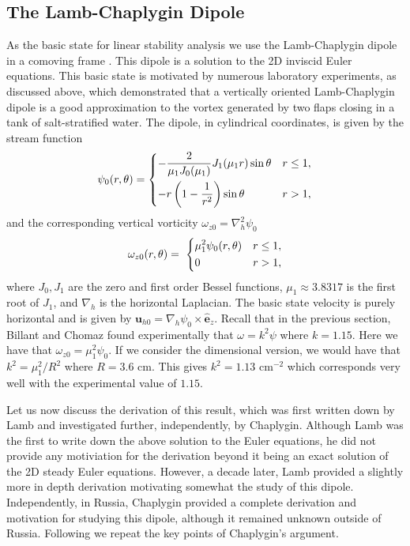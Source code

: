 \subsection{The Lamb-Chaplygin Dipole} 
As the basic state for linear stability analysis we use the Lamb-Chaplygin dipole in a comoving frame \cite{meleshko1994}. This dipole is a solution to the 2D inviscid Euler equations. This basic state is motivated by numerous laboratory experiments\cite{bc2000a,leweke1998}, as discussed above, which demonstrated that a vertically oriented Lamb-Chaplygin dipole is a good approximation to the vortex generated by two flaps closing in a tank of salt-stratified water. The dipole, in cylindrical coordinates, is given by the stream function
\begin{align}
\psi_{0}(r,\theta) = 
\begin{dcases}
-\frac{2}{\mu_{1}J_{0}(\mu_{1})}J_{1}(\mu_{1}r)\sin\theta & r\le 1,\\\label{lc_dipole_sf}
-r\left(1-\frac{1}{r^{2}}\right)\sin\theta & r>1 ,
\end{dcases}
\end{align}
and the corresponding vertical vorticity $\omega_{z0}=\nabla_{h}^{2}\psi_{0}$
\begin{align}
\omega_{z0}(r,\theta) = \
\begin{dcases}
\mu_{1}^{2}\psi_{0}(r,\theta) & r\le 1,\\
0 & r>1,
\end{dcases}
\end{align}
where $J_{0},J_{1}$ are the zero and first order Bessel functions, $\mu_{1}\approx 3.8317$ is the first root of $J_{1}$, and $\nabla_{h}$ is the horizontal Laplacian. The basic state velocity is purely horizontal and is given by $\bm{u}_{h0}=\nabla_{h}\psi_{0}\times\hat{\bm{e}}_{z}$. Recall that in the previous section, Billant and Chomaz found experimentally that $\omega = k^{2}\psi$ where $k=1.15$. Here we have that $\omega_{z0}=\mu_{1}^{2}\psi_{0}$. If we consider the dimensional version, we would have that $k^{2} = \mu_{1}^{2}/R^{2}$ where $R=3.6$ cm. This gives $k^{2} = 1.13 \text{ cm}^{-2}$ which corresponds very well with the experimental value of $1.15$.

Let us now discuss the derivation of this result, which was first written down by Lamb and investigated further, independently, by Chaplygin. Although Lamb was the first to write down the above solution to the Euler equations, he did not provide any motiviation for the derivation beyond it being an exact solution of the 2D steady Euler equations. However, a decade later, Lamb provided a slightly more in depth derivation motivating somewhat the study of this dipole. Independently, in Russia, Chaplygin provided a complete derivation and motivation for studying this dipole, although it remained unknown outside of Russia. Following \cite{meleshko1994} we repeat the key points of Chaplygin's argument. 

